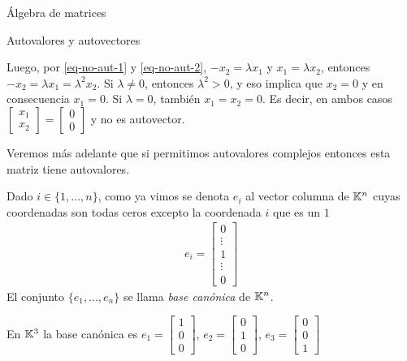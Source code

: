 \begin{chapter}{\'Algebra de matrices}
\begin{section}{Autovalores y autovectores}
\begin{observacion*}
        Luego, por \eqref{eq-no-aut-1} y \eqref{eq-no-aut-2}, $-x_2 = \lambda x_1$ y $x_1 = \lambda x_2$,  entonces   $-x_2 = \lambda x_1 = \lambda^2 x_2$. Si  $\lambda \ne0$,  entonces $\lambda^2 >0$, y eso implica que $x_2=0$ y  en consecuencia $x_1=0$. Si $\lambda=0$, también $x_1=x_2 =0$. Es decir, en ambos casos $\begin{bmatrix}x_1\\x_2\end{bmatrix} = \begin{bmatrix}0\\0\end{bmatrix} $ y no es autovector.

        Veremos más adelante que si permitimos autovalores complejos entonces esta matriz tiene  autovalores.
        \end{observacion*}

        \begin{definicion}
        
        Dado $i\in\{1, ..., n\}$, como ya vimos se denota \textit{$e_i$} al vector columna de $\mathbb K^n$ cuyas coordenadas son todas ceros excepto la coordenada $i$ que es un $1$
        \begin{align*}
        e_i=\left[
        \begin{array}{c}
        0\\ \vdots\\1\\ \vdots\\0
        \end{array}
        \right]
        \end{align*}
        El conjunto $\{e_1, ..., e_n\}$ se llama \textit{base canónica} de $\mathbb K^n$.
        \end{definicion}

        \begin{ejemplo*}
        En $\mathbb K^3$ la base canónica es  $
        e_1=\left[
        \begin{array}{c}
        1\\0\\0
        \end{array}
        \right]$, $
        e_2=\left[
        \begin{array}{c}
        0\\1\\0
        \end{array}
        \right]$, 
        $
        e_3=\left[
        \begin{array}{c}
        0\\0\\1
        \end{array}
        \right]
        $
        \end{ejemplo*}


\end{section}
\end{chapter}
